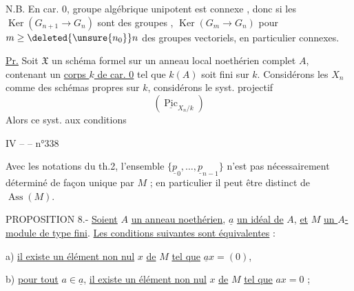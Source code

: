 N.B. En car. 0,  groupe algébrique  unipotent est connexe , donc si les $\operatorname{Ker}(G_{n+1}\longrightarrow G_n)$ sont des groupes ,   $\operatorname{Ker}(G_m\longrightarrow G_n)$ pour $m\geq\deleted{\unsure{n_0}}n$  des groupes vectoriels, en particulier connexes.


\uline{Pr.} Soit $\mathfrak X$ un schéma formel  sur un anneau local noethérien complet $A$, contenant un \uline{corps $k$ de car. 0} tel que  $k(A)$ soit fini sur $k$. Considérons les $X_n$ comme des schémas propres sur $k$,  considérons le syst. projectif
\[
(\underline{\operatorname{Pic}}_{X_n/k})
\]
Alors ce syst.  aux conditions




IV --  -- \hfill n°338

Avec les notations du th.2, l'ensemble $\{\underline p_0,\ldots,\underline p_{n-1}\}$ n'est pas nécessairement déterminé de façon unique par $M$ ; en particulier il peut être distinct de $\operatorname{Ass}(M)$.

PROPOSITION 8.- \uline{Soient} $A$ \uline{un anneau noethérien}, $\underline a$ \uline{un idéal de} $A$, \uline{et} $M$ \uline{un $A$-module de type fini}. \uline{Les conditions suivantes sont équivalentes} :

a) \uline{il existe un élément non nul} $x$ \uline{de} $M$ \uline{tel que} $\underline ax=(0)$,

b) \uline{pour tout} $a\in\underline a$, \uline{il existe un élément non nul} $x$ \uline{de} $M$ \uline{tel que} $ax=0$ ;

